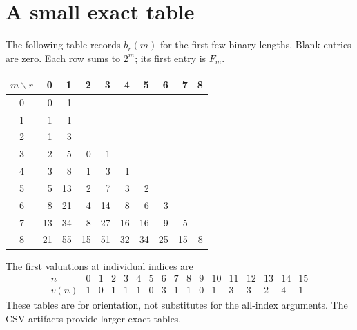 \documentclass[11pt]{article}
\theoremstyle{definition}\newtheorem{definition}[theorem]{Definition}
\theoremstyle{remark}\newtheorem{remark}[theorem]{Remark}
\begin{document}
\section{A small exact table}\label{sec:smalltable}

The following table records $b_r(m)$ for the first few binary lengths.
Blank entries are zero. Each row sums to $2^m$; its first entry is $F_m$.
\begin{center}
\setlength{\tabcolsep}{7pt}
\begin{tabular}{c rrrrrrrrr}
\toprule
$m\backslash r$&0&1&2&3&4&5&6&7&8\\
\midrule
0&0&1&&&&&&&\\
1&1&1&&&&&&&\\
2&1&3&&&&&&&\\
3&2&5&0&1&&&&&\\
4&3&8&1&3&1&&&&\\
5&5&13&2&7&3&2&&&\\
6&8&21&4&14&8&6&3&&\\
7&13&34&8&27&16&16&9&5&\\
8&21&55&15&51&32&34&25&15&8\\
\bottomrule
\end{tabular}
\end{center}

The first valuations at individual indices are
\[
\begin{array}{c|rrrrrrrrrrrrrrrr}
 n&0&1&2&3&4&5&6&7&8&9&10&11&12&13&14&15\\\hline
 v(n)&1&0&1&1&1&0&3&1&1&0&1&3&3&2&4&1
\end{array}
\]
These tables are for orientation, not substitutes for the all-index
arguments. The CSV artifacts provide larger exact tables.
\end{document}
